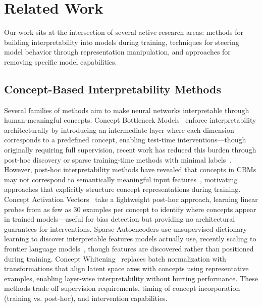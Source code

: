 \section{Related Work}
\label{sec:related_work}

Our work sits at the intersection of several active research areas: methods for building interpretability into models during training, techniques for steering model behavior through representation manipulation, and approaches for removing specific model capabilities.

\subsection{Concept-Based Interpretability Methods}

Several families of methods aim to make neural networks interpretable through human-meaningful concepts. Concept Bottleneck Models~\citep{KohNTMPKL20} enforce interpretability architecturally by introducing an intermediate layer where each dimension corresponds to a predefined concept, enabling test-time interventions---though originally requiring full supervision, recent work has reduced this burden through post-hoc discovery or sparse training-time methods with minimal labels~\citep{oikarinen2023labelfreeconceptbottleneckmodels,semenov2024sparseconceptbottleneckmodels,Sawada2022ConceptBM}. However, post-hoc interpretability methods have revealed that concepts in CBMs may not correspond to semantically meaningful input features~\citep{Margeloiu2021DoCB}, motivating approaches that explicitly structure concept representations during training. Concept Activation Vectors~\citep{KimWGCWVS18} take a lightweight post-hoc approach, learning linear probes from as few as 30 examples per concept to identify where concepts appear in trained models---useful for bias detection but providing no architectural guarantees for interventions. Sparse Autoencoders use unsupervised dictionary learning to discover interpretable features models actually use, recently scaling to frontier language models~\citep{HubenCRES24,templeton2024scaling}, though features are discovered rather than positioned during training. Concept Whitening~\citep{Chen_2020} replaces batch normalization with transformations that align latent space axes with concepts using representative examples, enabling layer-wise interpretability without hurting performance. These methods trade off supervision requirements, timing of concept incorporation (training vs. post-hoc), and intervention capabilities.


